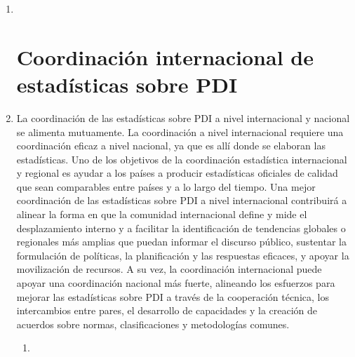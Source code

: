 \documentclass[
]{book}
\begin{document}
\begin{enumerate}
\def\labelenumi{\arabic{enumi}.}
\item ~
  \hypertarget{coordinaciuxf3n-internacional-de-estaduxedsticas-sobre-pdi}{%
  \section{Coordinación internacional de estadísticas sobre PDI}\label{coordinaciuxf3n-internacional-de-estaduxedsticas-sobre-pdi}}
\item
  La coordinación de las estadísticas sobre PDI a nivel internacional y nacional se alimenta mutuamente. La coordinación a nivel internacional requiere una coordinación eficaz a nivel nacional, ya que es allí donde se elaboran las estadísticas. Uno de los objetivos de la coordinación estadística internacional y regional es ayudar a los países a producir estadísticas oficiales de calidad que sean comparables entre países y a lo largo del tiempo. Una mejor coordinación de las estadísticas sobre PDI a nivel internacional contribuirá a alinear la forma en que la comunidad internacional define y mide el desplazamiento interno y a facilitar la identificación de tendencias globales o regionales más amplias que puedan informar el discurso público, sustentar la formulación de políticas, la planificación y las respuestas eficaces, y apoyar la movilización de recursos. A su vez, la coordinación internacional puede apoyar una coordinación nacional más fuerte, alineando los esfuerzos para mejorar las estadísticas sobre PDI a través de la cooperación técnica, los intercambios entre pares, el desarrollo de capacidades y la creación de acuerdos sobre normas, clasificaciones y metodologías comunes.

  \begin{enumerate}
  \def\labelenumii{\arabic{enumii}.}
  \item ~
    \hypertarget{organizaciones-y-procesos-internacionales-pertinentes}{%
}
\end{enumerate}
\end{enumerate}
\end{document}
